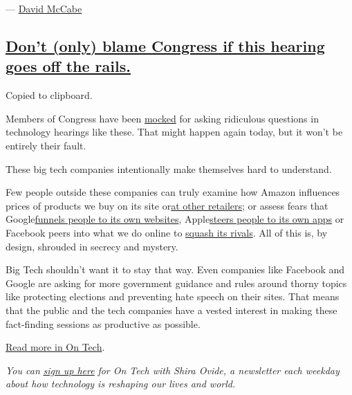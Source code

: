 --- \href{https://www.nytimes3xbfgragh.onion/by/david-mccabe}{David
McCabe}

\hypertarget{dont-only-blame-congress-if-this-hearing-goes-off-the-rails}{%
\subsection{\texorpdfstring{\protect\hyperlink{dont-only-blame-congress-if-this-hearing-goes-off-the-rails}{Don't
(only) blame Congress if this hearing goes off the
rails.}}{Don't (only) blame Congress if this hearing goes off the rails.}}\label{dont-only-blame-congress-if-this-hearing-goes-off-the-rails}}

Copied to clipboard.

Members of Congress have been
\href{https://www.thewrap.com/senator-orrin-hatch-facebook-biz-model-zuckerberg/}{mocked}
for asking ridiculous questions in technology hearings like these. That
might happen again today, but it won't be entirely their fault.

These big tech companies intentionally make themselves hard to
understand.

Few people outside these companies can truly examine how Amazon
influences prices of products we buy on its site
or\href{https://www.bloomberg.com/news/articles/2019-08-05/amazon-is-squeezing-sellers-that-offer-better-prices-on-walmart}{at
other retailers}; or assess fears that
Google\href{https://themarkup.org/google-the-giant/2020/07/28/google-search-results-prioritize-google-products-over-competitors}{funnels
people to its own websites},
Apple\href{https://www.nytimes3xbfgragh.onion/interactive/2019/09/09/technology/apple-app-store-competition.html}{steers
people to its own apps} or Facebook peers into what we do online to
\href{https://www.nytimes3xbfgragh.onion/2018/12/05/technology/facebook-emails-privacy-data.html}{squash
its rivals}. All of this is, by design, shrouded in secrecy and mystery.

Big Tech shouldn't want it to stay that way. Even companies like
Facebook and Google are asking for more government guidance and rules
around thorny topics like protecting elections and preventing hate
speech on their sites. That means that the public and the tech companies
have a vested interest in making these fact-finding sessions as
productive as possible.

\href{https://www.nytimes3xbfgragh.onion/2020/07/29/technology/congress-big-tech.html}{Read
more in On Tech}.

\emph{You can}
\href{https://www.nytimes3xbfgragh.onion/newsletters/signup/OT}{\emph{sign
up here}} \emph{for On Tech with Shira Ovide, a newsletter each weekday
about how technology is reshaping our lives and world.}

